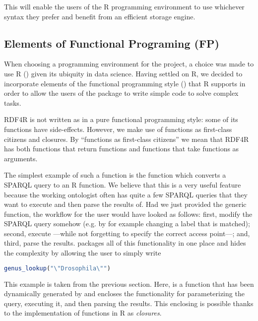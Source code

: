 This will enable the users of the R programming environment to use whichever syntax they prefer and benefit from an efficient storage engine.

\subsection{Elements of Functional Programing (FP)}

When choosing a programming environment for the project, a choice was made to use R (\cite{r_core_team_r:_2016}) given its ubiquity in data science. Having settled on R, we decided to incorporate elements of the functional programming style (\cite{wickham_advanced_2015}) that R supports in order to allow the users of the package to write simple code to solve complex tasks.

RDF4R is not written as in a pure functional programming style: some of its functions have side-effects. However, we make use of functions as first-class citizens and closures. By ``functions as first-class citizens'' we mean that RDF4R has both functions that return functions and functions that take functions as arguments.

The simplest example of such a function is the  function which converts a SPARQL query to an R function. We believe that this is a very useful feature because the working ontologist often has quite a few SPARQL queries that they want to execute and then parse the results of. Had we just provided the generic  function, the workflow for the user would have looked as follows: first, modify the SPARQL query somehow (e.g. by for example changing a label that is matched); second, execute ---while not forgetting to specify the correct access point---; and, third, parse the results.  packages all of this functionality in one place and hides the complexity by allowing the user to simply write

\begin{lstlisting}[language=R,
style=customr]
genus_lookup("\"Drosophila\"")
\end{lstlisting}

This example is taken from the previous section. Here,  is a function that has been dynamically generated by  and encloses the functionality for parameterizing the query, executing it, and then parsing the results. This enclosing is possible thanks to the implementation of functions in R as \emph{closures}.

